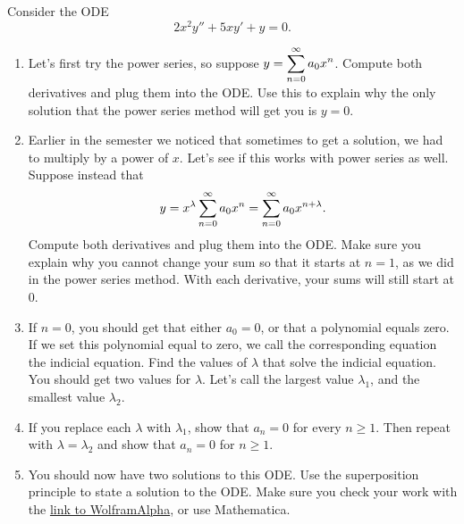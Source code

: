 \begin{problem}%
Consider the ODE $$2x^2y''+5xy'+y=0.$$  
\begin{enumerate}
 \item Let's first try the power series, so suppose $\displaystyle y=\sum_{n=0}^\infty a_0 x^n$. Compute both derivatives and plug them into the ODE. Use this to explain why the only solution that the power series method will get you is $y=0$.
 \item {}%
Earlier in the semester we noticed that sometimes to get a solution, we had to multiply by a power of $x$. Let's see if this works with power series as well.  Suppose instead that $$\displaystyle y=x^\lambda \sum_{n=0}^\infty a_0 x^n = \sum_{n=0}^\infty a_0 x^{n+\lambda}.$$ 
 Compute both derivatives and plug them into the ODE. Make sure you explain why you cannot change your sum so that it starts at $n=1$, as we did in the power series method. With each derivative, your sums will still start at 0.  
 \item If $n=0$, you should get that either $a_0=0$, or that a polynomial equals zero. If we set this polynomial equal to zero, we call the corresponding equation the indicial equation.  Find the values of $\lambda$ that solve the indicial equation. You should get two values for $\lambda$. Let's call the largest value $\lambda_1$, and the smallest value $\lambda_2$. 
 \item If you replace each $\lambda$ with $\lambda_1$, show that $a_n=0$ for every $n\geq 1$.  Then  repeat with $\lambda=\lambda_2$ and show that $a_n=0$ for $n\geq 1$.  
 \item {}
You should now have two solutions to this ODE.  Use the superposition principle to state a solution to the ODE.  Make sure you check your work with the \href{http://www.wolframalpha.com/input/?i=dsolve+2x\%5E2+y\%27\%27+\%2B5x+y\%27+\%2By\%3D0}{link to WolframAlpha}, or use Mathematica.
\end{enumerate}

\end{problem}

